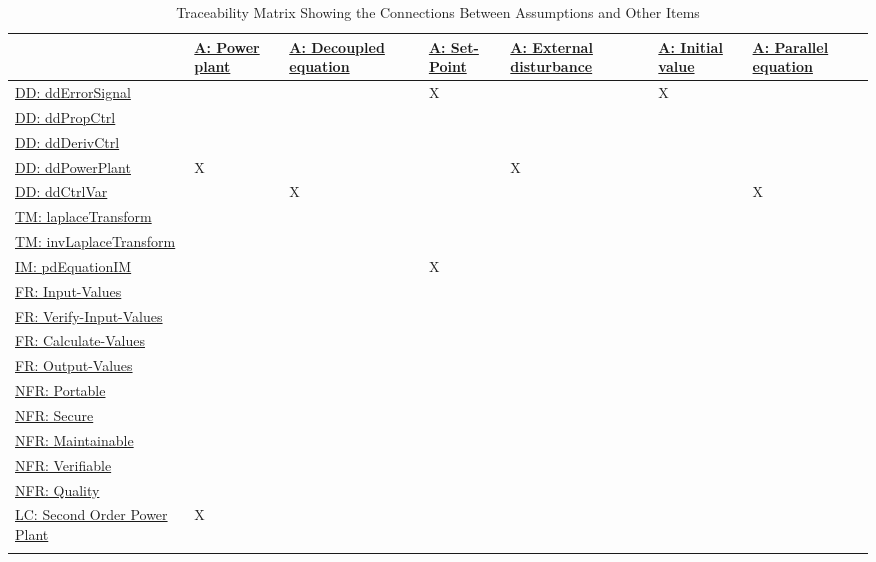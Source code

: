 \documentclass[12pt]{article}
\begin{document}
\begin{longtable}{l l l l l l l}
\toprule
\textbf{} & \textbf{\hyperref[pwrPlant]{A: Power plant}} & \textbf{\hyperref[decoupled]{A: Decoupled equation}} & \textbf{\hyperref[setPoint]{A: Set-Point}} & \textbf{\hyperref[externalDistub]{A: External disturbance}} & \textbf{\hyperref[initialValue]{A: Initial value}} & \textbf{\hyperref[parallelEq]{A: Parallel equation}}
\\
\midrule
\endhead
\hyperref[DD:ddErrorSignal]{DD: ddErrorSignal} &  &  & X &  & X & 
\\
\hyperref[DD:ddPropCtrl]{DD: ddPropCtrl} &  &  &  &  &  & 
\\
\hyperref[DD:ddDerivCtrl]{DD: ddDerivCtrl} &  &  &  &  &  & 
\\
\hyperref[DD:ddPowerPlant]{DD: ddPowerPlant} & X &  &  & X &  & 
\\
\hyperref[DD:ddCtrlVar]{DD: ddCtrlVar} &  & X &  &  &  & X
\\
\hyperref[TM:laplaceTransform]{TM: laplaceTransform} &  &  &  &  &  & 
\\
\hyperref[TM:invLaplaceTransform]{TM: invLaplaceTransform} &  &  &  &  &  & 
\\
\hyperref[IM:pdEquationIM]{IM: pdEquationIM} &  &  & X &  &  & 
\\
\hyperref[inputValues]{FR: Input-Values} &  &  &  &  &  & 
\\
\hyperref[verifyInputs]{FR: Verify-Input-Values} &  &  &  &  &  & 
\\
\hyperref[calculateValues]{FR: Calculate-Values} &  &  &  &  &  & 
\\
\hyperref[outputValues]{FR: Output-Values} &  &  &  &  &  & 
\\
\hyperref[portability]{NFR: Portable} &  &  &  &  &  & 
\\
\hyperref[security]{NFR: Secure} &  &  &  &  &  & 
\\
\hyperref[maintainability]{NFR: Maintainable} &  &  &  &  &  & 
\\
\hyperref[verifiability]{NFR: Verifiable} &  &  &  &  &  & 
\\
\hyperref[quality]{NFR: Quality} &  &  &  &  &  & 
\\
\hyperref[likeChgIC]{LC: Second Order Power Plant} & X &  &  &  &  & 
\\
\bottomrule
\caption{Traceability Matrix Showing the Connections Between Assumptions and Other Items}
\label{Table:TraceMatAvsAll}
\end{longtable}
\end{document}
